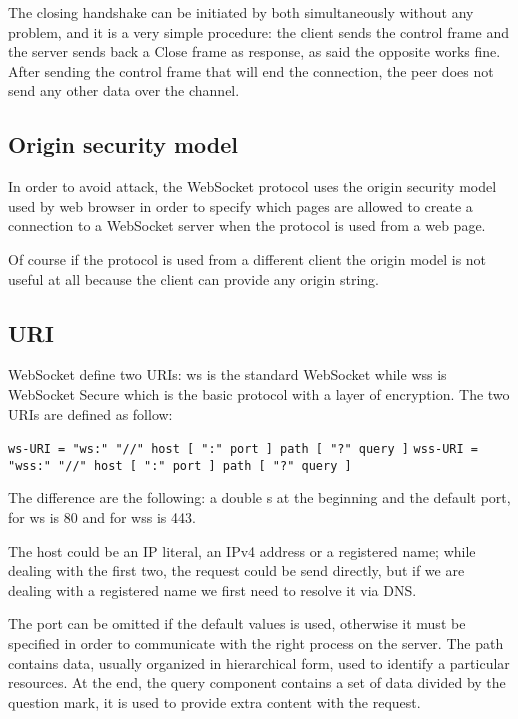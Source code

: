 The closing handshake can be initiated by both simultaneously without any problem, and it is a very simple procedure:
the client sends the control frame and the server sends back a Close frame as response, as said the opposite works fine.\newline
After sending the control frame that will end the connection, the peer does not send any other data over the channel.

\subsection{Origin security model}
In order to avoid attack, the WebSocket protocol uses the origin security model used by web browser in order
to specify which pages are allowed to create a connection to a WebSocket server when the protocol is used from a web page.\newline

Of course if the protocol is used from a different client the origin model is not useful at all because the client can provide any origin string.

\subsection{URI}
WebSocket define two URIs: ws is the standard WebSocket while wss is WebSocket Secure which is the basic protocol with a layer of encryption.\newline
The two URIs are defined as follow:\newline

\texttt{ws-URI = "ws:" "//" host [ ":" port ] path [ "?" query ]}\newline
\texttt{wss-URI = "wss:" "//" host [ ":" port ] path [ "?" query ]}\newline

The difference are the following: a double s at the beginning and the default port, for ws is 80 and for wss is 443.\newline

The host could be an IP literal, an IPv4 address or a registered name; while dealing with the first two, the request could be send directly, but if we are dealing with a registered name we first need to resolve it via DNS.\newline

The port can be omitted if the default values is used, otherwise it must be specified in order to communicate with the right process on the server.\newline
The path contains data, usually organized in hierarchical form, used to identify a particular resources.\newline
At the end, the query component contains a set of data divided by the question mark, it is used to provide extra content with the request.\newline

